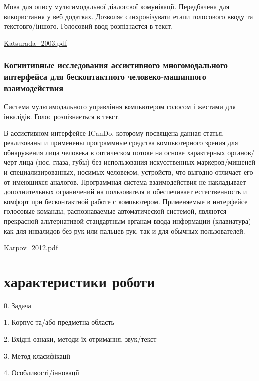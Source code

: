Мова для опису мультимодальної діалогової комунікації. Передбачена для використання у веб додатках. Дозволяє синхронізувати етапи голосового вводу та текстовго/іншого. Голосовий ввод розпізнаєтся в текст.

\url{Katsurada_2003.pdf}\cite{Katsurada_2003} 

\subsection{Когнитивные исследования ассистивного многомодального интерфейса для бесконтактного человеко-машинного взаимодействия}

Система мультимодального управління компьютером голосом і жестами для інвалідів. Голос розпізнається в текст.

В ассистивном интерфейсе ICanDo, которому
посвящена данная статья, реализованы и применены
программные средства компьютерного зрения
для обнаружения лица человека в оптическом
потоке на основе характерных органов/черт лица
(нос, глаза, губы) без использования искусственных
маркеров/мишеней и специализированных, носимых
человеком, устройств, что выгодно отличает
его от имеющихся аналогов. Программная система
взаимодействия не накладывает дополнительных
ограничений на пользователя и обеспечивает
естественность и комфорт при бесконтактной работе
с компьютером. Применяемые в интерфейсе
голосовые команды, распознаваемые автоматической
системой, являются прекрасной альтернативой
стандартным органам ввода информации (клавиатура)
как для инвалидов без рук или пальцев
рук, так и для обычных пользователей.

\url{Karpov_2012.pdf}\cite{Karpov_2012}

\chapter{характеристики роботи}

0. Задача

1. Корпус та/або предметна область

2. Вхідні ознаки, методи їх отримання, звук/текст

3. Метод класифікації

4. Особливості/інновації

\printbibliography
